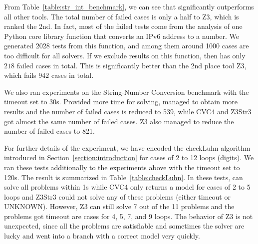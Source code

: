 From Table~\ref{table:str_int_benchmark}, we can see that {\tool} significantly outperforms all other tools. The total number of failed cases is only a half to Z3, which is ranked the 2nd. In fact, most of the failed tests come from the analysis of one Python core library function that converts an IPv6 address to a number. We generated 2028 tests from this function, and among them around 1000 cases  are too difficult for all solvers.  If we exclude results on this function, then {\tool} has only $218$ failed cases in total. This is significantly better than the 2nd place tool Z3, which fails $942$ cases in total.

We also ran experiments on the String-Number Conversion benchmark with the timeout set to 30s. Provided more time for solving, {\tool} managed to obtain more results and the number of failed cases is reduced to 539, while CVC4 and Z3Str3 got almost the same number of failed cases. Z3 also managed to reduce the number of failed cases to 821. %

For further details of the experiment, we have encoded the checkLuhn algorithm introduced in Section~\ref{section:introduction} for cases of 2 to 12 loops (digits). We ran these tests additionally to the experiments above with the timeout set to 120s. The result is summarized in Table~\ref{table:checkLuhn}.
In these tests, {\tool} can solve all problems within 1s while CVC4 only returns a model for cases of 2 to 5 loops and Z3Str3 could not solve any of these problems (either timeout or UNKNOWN). However, Z3 can still solve 7 out of the 11 problems and the problems got timeout are cases for 4, 5, 7, and 9 loops. The behavior of Z3 is not unexpected, since all the problems are satisfiable and sometimes the solver are lucky and went into a branch with a correct model very quickly.

